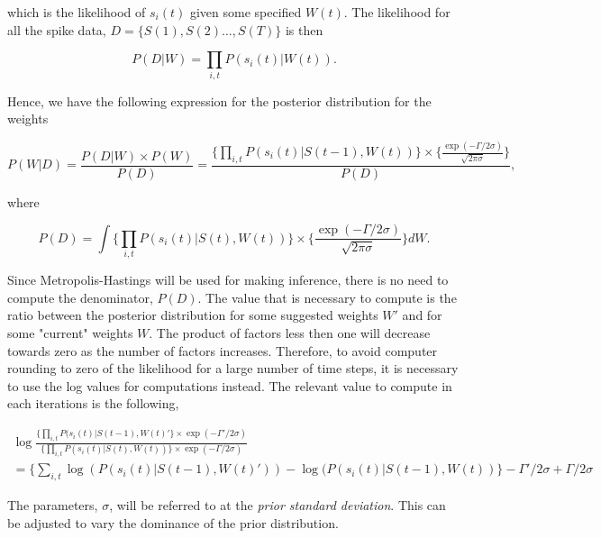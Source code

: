which is the likelihood of $s_i(t)$ given some specified $W(t)$. The likelihood for all the spike data, $D=\{S(1), S(2)...,S(T)\}$ is then

\begin{equation}
    P(D|W) = \prod_{i,t} P(s_i(t)|W(t)).
\end{equation}

Hence, we have the following expression for the posterior distribution for the weights

\begin{equation}
\label{Posterior}
        P(W|D) = \frac{P(D|W)\times P(W)}{P(D)} = \frac{\Big\{\prod_{i,t} P(s_{i}(t)|S(t-1), W(t))\Big\} \times \Big\{\frac{\exp(-\Gamma /2\sigma)}{\sqrt{2\pi \sigma}}\Big\}}{P(D)}, 
\end{equation}

where

\begin{equation}
        P(D) = \int \Big\{\prod_{i,t} P(s_{i}(t)|S(t), W(t))\Big\} \times \Big\{\frac{\exp(-\Gamma /2\sigma)}{\sqrt{2\pi \sigma}}\Big\} d{W}.
\end{equation}

Since Metropolis-Hastings will be used for making inference, there is no need to compute the denominator, $P(D)$. The value that is necessary to compute is the ratio between the posterior distribution for some suggested weights $W'$ and for some "current" weights $W$. The product of factors less then one will decrease towards zero as the number of factors increases. Therefore, to avoid computer rounding to zero of the likelihood for a large number of time steps, it is necessary to use the log values for computations instead. The relevant value to compute in each iterations is the following,

\begin{equation}
\label{eq:ratio}
\begin{split}
    \log \frac{\big \{ \prod_{i,t} P(s_{i}(t)|S(t-1), W(t)'\big \} \times \exp(-\Gamma' /2\sigma)}{\big \{ \prod_{i,t}  P(s_{i}(t)|S(t), W(t)) \big \} \times \exp(-\Gamma /2\sigma)} \\
    = \Big \{ \sum_{i,t} \log( P(s_{i}(t)|S(t-1), W(t)')) - \log( P(s_{i}(t)|S(t-1), W(t)) \Big \} -\Gamma' /2\sigma +  \Gamma /2\sigma
\end{split}
\end{equation}

The parameters, $\sigma$, will be referred to at the \textit{prior standard deviation}. This can be adjusted to vary the dominance of the prior distribution. 



